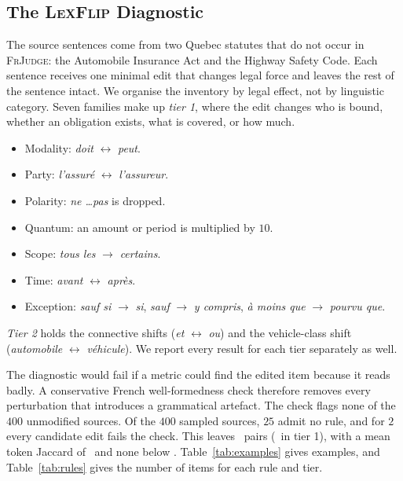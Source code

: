 \documentclass{BVP_JCLLT}
\newcommand{\rev}[1]{#1}
\newcommand{\rev}[1]{{\color{revcol}#1}}
\begin{document}
\subsection{The \textsc{LexFlip} Diagnostic}\label{sec:lexflip}

\rev{The source sentences come from two Quebec statutes that do not occur in
\textsc{FrJudge}: the Automobile Insurance Act and the Highway Safety Code. Each
sentence receives one minimal edit that changes legal force and leaves the rest
of the sentence intact. We organise the inventory by legal effect, not by
linguistic category. Seven families make up \emph{tier 1}, where the edit
changes who is bound, whether an obligation exists, what is covered, or how
much.

\begin{itemize}\itemsep1pt
\item Modality: \emph{doit} $\leftrightarrow$ \emph{peut}.
\item Party: \emph{l'assur\'e} $\leftrightarrow$ \emph{l'assureur}.
\item Polarity: \emph{ne \dots pas} is dropped.
\item Quantum: an amount or period is multiplied by $10$.
\item Scope: \emph{tous les} $\rightarrow$ \emph{certains}.
\item Time: \emph{avant} $\leftrightarrow$ \emph{apr\`es}.
\item Exception: \emph{sauf si} $\rightarrow$ \emph{si}, \emph{sauf}
  $\rightarrow$ \emph{y compris}, \emph{\`a moins que} $\rightarrow$
  \emph{pourvu que}.
\end{itemize}

\emph{Tier 2} holds the connective shifts (\emph{et} $\leftrightarrow$
\emph{ou}) and the vehicle-class shift (\emph{automobile} $\leftrightarrow$
\emph{v\'ehicule}). We report every result for each tier separately as well.

The diagnostic would fail if a metric could find the edited item because it
reads badly. A conservative French well-formedness check therefore removes every
perturbation that introduces a grammatical artefact. The check flags none of the
$400$ unmodified sources. Of the $400$ sampled sources, $25$ admit no rule, and
for $2$ every candidate edit fails the check. This leaves \numedits\ pairs
(\numeditsTierOne\ in tier 1), with a mean token Jaccard of \meanjaccard\ and
none below \minjaccard. Table~\ref{tab:examples} gives examples, and
Table~\ref{tab:rules} gives the number of items for each rule and tier.

}
\end{document}
